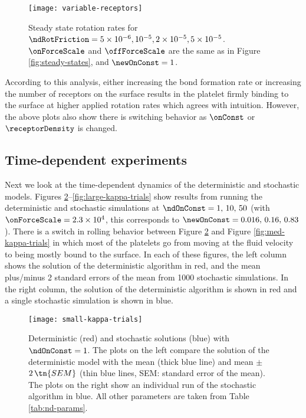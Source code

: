 \begin{figure}
  \centering
  \texttt{[image: variable-receptors]}
  \caption[Steady state rotation rates for 4 different
  $\ndRotFriction$ values.]{Steady state rotation rates for
    $\ndRotFriction = 5 \times 10^{-6}, 10^{-5}, 2 \times 10^{-5}, 5
    \times 10^{-5}$. $\onForceScale$ and $\offForceScale$ are the same
    as in Figure \ref{fig:steady-states}, and $\newOnConst = 1$.}
  \label{fig:variable-receptors}
\end{figure}

According to this analysis, either increasing the bond formation rate
or increasing the number of receptors on the surface results in the
platelet firmly binding to the surface at higher applied rotation
rates which agrees with intuition. However, the above plots also show
there is switching behavior as $\onConst$ or $\receptorDensity$ is
changed.

\subsection{Time-dependent experiments}
\label{sec:time-dep-exp}

Next we look at the time-dependent dynamics of the deterministic and
stochastic models. Figures
\ref{fig:small-kappa-trials}--\ref{fig:large-kappa-trials} show
results from running the deterministic and stochastic simulations at
$\ndOnConst = 1, \, 10, \, 50$ (with
$\onForceScale = 2.3 \times 10^4$, this corresponds to
$\newOnConst = 0.016, \, 0.16, \, 0.83$). There is a switch in rolling
behavior between Figure \ref{fig:small-kappa-trials} and Figure
\ref{fig:med-kappa-trials} in which most of the platelets go from
moving at the fluid velocity to being mostly bound to the surface. In
each of these figures, the left column shows the solution of the
deterministic algorithm in red, and the mean plus/minus 2 standard
errors of the mean from 1000 stochastic simulations. In the right
column, the solution of the deterministic algorithm is shown in red
and a single stochastic simulation is shown in blue.

\begin{figure}
  \centering
  \texttt{[image: small-kappa-trials]}
  \caption[Deterministic and stochastic solutions with
  $\ndOnConst = 1$.]{Deterministic (red) and stochastic solutions
    (blue) with $\ndOnConst = 1$. The plots on the left compare the
    solution of the deterministic model with the mean (thick blue
    line) and mean $\pm$ $2\,\tn{SEM}$ (thin blue lines, SEM: standard
    error of the mean). The plots on the right show an individual run
    of the stochastic algorithm in blue. All other parameters are
    taken from Table \ref{tab:nd-params}.}
  \label{fig:small-kappa-trials}
\end{figure}

